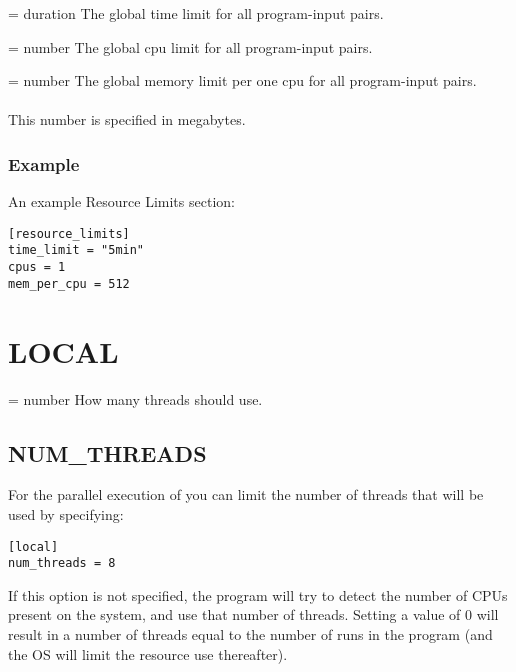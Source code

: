 \documentclass[a4paper,english]{article}
\begin{document}
\begin{adjustwidth}{18pt}{0pt}
          \begin{Description}[Options]\setlength{\itemsep}{0cm}
              \item[\Opt{time\_limit} = duration]
                The global time limit for all program-input pairs.
              \item[\Opt{cpu\_limit} = number]
                The global cpu limit for all program-input pairs.
              \item[\Opt{mem\_per\_cpu} = number]
                The global memory limit per one cpu for all program-input pairs. \\ \\
                This number is specified in megabytes.
          \end{Description}


          \subsubsection{Example}
              An example Resource Limits section:

              \begin{verbatim}
[resource_limits]
time_limit = "5min"
cpus = 1
mem_per_cpu = 512
              \end{verbatim}

    \section{LOCAL}
        \begin{Description}[Options]\setlength{\itemsep}{0cm}
            \item[\Opt{num\_threads?} = number]
                How many threads should    use.
        \end{Description}

        \subsection{NUM\_THREADS}
            For the parallel execution of    you can
            limit the number of threads that will be used by specifying:
            \begin{verbatim}
[local]
num_threads = 8
            \end{verbatim}
            If this option is not specified, the program will try to detect the number 
            of CPUs present on the system, and use that number of threads. Setting a 
            value of 0 will result in a number of threads equal to the number of runs in
            the program (and the OS will limit the resource use thereafter).

\end{adjustwidth}
\end{document}
